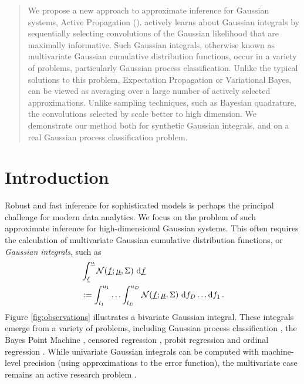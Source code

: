 \documentclass[twoside]{article}
\begin{document}

\begin{abstract}%
We propose a new approach to approximate inference for Gaussian systems, Active Propagation (\ap). \ap actively learns about Gaussian integrals by sequentially selecting convolutions of the Gaussian likelihood that are maximally informative. Such Gaussian integrals, otherwise known as multivariate Gaussian cumulative distribution functions, occur in a variety of problems, particularly Gaussian process classification. Unlike the typical solutions to this problem, Expectation Propagation or Variational Bayes, \ap can be viewed as averaging over a large number of actively selected approximations. Unlike sampling techniques, such as Bayesian quadrature, the convolutions selected by \ap scale better to high dimension. We demonstrate our method both for synthetic Gaussian integrals, and on a real Gaussian process classification problem. 
\end{abstract}


\section{Introduction}

Robust and fast inference for sophisticated models is perhaps the principal challenge for modern data analytics. We focus on the problem of such approximate inference for high-dimensional Gaussian systems. This often requires the calculation of multivariate Gaussian cumulative distribution functions, or \emph{Gaussian integrals}, such as 
\begin{align}\label{eq:GI}
& \int_{\underline{\smash{\ell}}}^{\underline{\smash{u}}} \mathcal{N}(\underline{\smash{f}};\underline{\smash{\mu}},\Sigma)~\mathrm{d} \underline{\smash{f}}\nonumber\\
& := \int_{l_1}^{u_1}\ldots\int_{l_D}^{u_D} \mathcal{N}(\underline{\smash{f}};\underline{\smash{\mu}},\Sigma)~\mathrm{d} f_D \ldots \mathrm{d} f_1\,.
\end{align}
Figure \ref{fig:observations} illustrates a bivariate Gaussian integral. These integrals emerge from a variety of problems, including Gaussian process  classification \citep{GpsBook}, the Bayes Point Machine \citep{herbrich2001bayes}, censored regression \citep{ertin2007gaussian}, probit regression \citep{ochi1984likelihood} and ordinal regression \citep{chu2005gaussian}. While univariate Gaussian integrals can be computed with machine-level precision (using approximations to the error function), the multivariate case remains an active research problem \citep{cunningham2011approximate}. 
\end{document}
